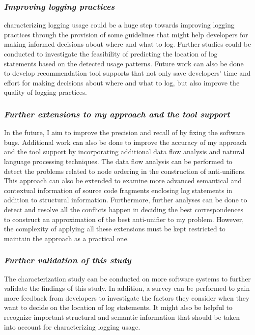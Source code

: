 \subsubsection{ \emph{Improving logging practices} }
characterizing logging usage could be a huge step towards improving logging practices through the provision of some guidelines that might help developers for making informed decisions about where and what to log. Further studies could be conducted to investigate the feasibility of predicting the location of log statements based on the detected usage patterns. Future work can also be done to develop recommendation tool supports that not only save developers’ time and effort for making decisions about where and what to log, but also improve the quality of logging practices.

\subsubsection{\emph{Further extensions to my approach and the tool support} }
In the future, I aim to improve the precision and recall of  by fixing the software bugs. Additional work can also be done to improve the accuracy of my approach and the tool support by incorporating additional data flow analysis and natural language processing techniques. The data flow analysis can be performed to detect the problems related to node ordering in the  construction of anti-unifiers. This approach can also be extended to examine more advanced semantical and contextual information of source code fragments enclosing log statements in addition to structural information. Furthermore, further analyses can be done to detect and resolve all the conflicts happen in deciding the best correspondences to construct an approximation of the best anti-unifier to my problem. However, the complexity of applying all these extensions must be kept restricted to maintain the approach as a practical one.

\subsubsection{\emph{Further validation of this study}} 
The characterization study can be conducted on more software systems to further validate the findings of this study. In addition, a survey can be performed to gain more feedback from developers to investigate the factors they consider when they want to decide on the location of log statements. It might also be helpful to recognize important structural and semantic information that should be taken into account for characterizing logging usage.

